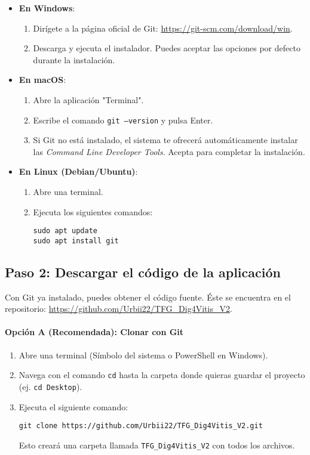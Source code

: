 \begin{itemize}
    \item \textbf{En Windows}:
    \begin{enumerate}
        \item Dirígete a la página oficial de Git: \url{https://git-scm.com/download/win}.
        \item Descarga y ejecuta el instalador. Puedes aceptar las opciones por defecto durante la instalación.
    \end{enumerate}
    
    \item \textbf{En macOS}:
    \begin{enumerate}
        \item Abre la aplicación "Terminal".
        \item Escribe el comando \texttt{git --version} y pulsa Enter.
        \item Si Git no está instalado, el sistema te ofrecerá automáticamente instalar las \textit{Command Line Developer Tools}. Acepta para completar la instalación.
    \end{enumerate}
    
    \item \textbf{En Linux (Debian/Ubuntu)}:
    \begin{enumerate}
        \item Abre una terminal.
        \item Ejecuta los siguientes comandos:
        \begin{verbatim}
sudo apt update
sudo apt install git
        \end{verbatim}
    \end{enumerate}
\end{itemize}

\subsection{Paso 2: Descargar el código de la aplicación}
Con Git ya instalado, puedes obtener el código fuente. Éste se encuentra en el repositorio: \url{https://github.com/Urbii22/TFG_Dig4Vitis_V2}.

\paragraph{Opción A (Recomendada): Clonar con Git}
\begin{enumerate}
    \item Abre una terminal (Símbolo del sistema o PowerShell en Windows).
    \item Navega con el comando \texttt{cd} hasta la carpeta donde quieras guardar el proyecto (ej. \texttt{cd Desktop}).
    \item Ejecuta el siguiente comando:
    \begin{verbatim}
git clone https://github.com/Urbii22/TFG_Dig4Vitis_V2.git
    \end{verbatim}
    Esto creará una carpeta llamada \texttt{TFG\_Dig4Vitis\_V2} con todos los archivos.
\end{enumerate}

